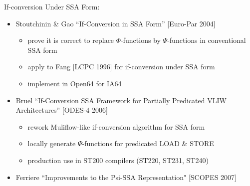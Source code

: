 If-conversion Under SSA Form:
\begin{itemize}

\item Stoutchinin \& Gao ``If-Conversion in SSA Form'' [Euro-Par 2004]
\begin{itemize}
\item prove it is correct to replace $\Phi$-functions by $\Psi$-functions
in conventional SSA form
\item apply to Fang [LCPC 1996] for if-conversion under SSA form
\item implement in Open64 for IA64
\end{itemize}

\item Bruel ``If-Conversion SSA Framework for Partially Predicated VLIW
Architectures'' [ODES-4 2006]
\begin{itemize}
\item rework Muliflow-like if-conversion algorithm for SSA form
\item locally generate $\Psi$-functions for predicated LOAD \& STORE
\item production use in ST200 compilers (ST220, ST231, ST240)
\end{itemize}

\item Ferriere ``Improvements to the Psi-SSA Representation" [SCOPES 2007]

\end{itemize}




